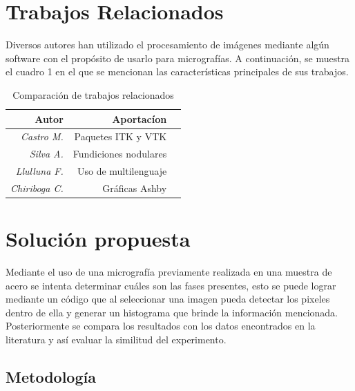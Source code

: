\documentclass[12pt,twocolumn]{article}
\begin{document}
\section{Trabajos Relacionados}
Diversos autores han utilizado el procesamiento de im\'agenes mediante alg\'un software con el prop\'osito de usarlo para micrograf\'ias. A continuaci\'on, se muestra el cuadro 1  en el que se mencionan las caracter\'isticas principales de sus trabajos.

\begin{table}[H]
\centering
\caption{Comparaci\'on de trabajos relacionados}
\begin{tabular}{rrr}

\hline
Autor&Aportac\'ion\\
\hline
\textit{Castro M.}\cite{ref6}&Paquetes ITK y VTK\\
\textit{Silva A.}\cite{ref3}& Fundiciones nodulares\\
\textit{Llulluna F.}\cite{ref2}&Uso de multilenguaje\\
\textit{Chiriboga C.}\cite{ref4}&Gr\'aficas Ashby\\

\hline
\end{tabular}
\label{t1}
\end{table}


\section{Soluci\'on propuesta}

Mediante el uso de una micrograf\'ia previamente realizada en una muestra de acero se intenta determinar cu\'ales son las fases presentes, esto se puede lograr mediante un c\'odigo que al seleccionar una imagen pueda detectar los pixeles dentro de ella y generar un histograma que brinde la informaci\'on mencionada. Posteriormente se compara los resultados con los datos encontrados en la literatura y as\'i evaluar la similitud del experimento.

\subsection{Metodolog\'ia}
\end{document}
